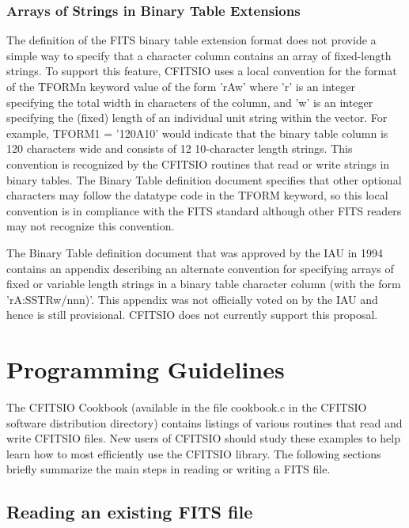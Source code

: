 \subsection{Arrays of Strings in Binary Table Extensions}

The definition of the FITS binary table extension format does not
provide a simple way to specify that a character column contains an
array of fixed-length strings.  To support this feature, CFITSIO uses a
local convention for the format of the TFORMn keyword value of the form
'rAw' where 'r' is an integer specifying the total width in characters
of the column, and 'w' is an integer specifying the (fixed) length of
an individual unit string within the vector.  For example, TFORM1 =
'120A10' would indicate that the binary table column is 120 characters
wide and consists of 12 10-character length strings.  This convention
is recognized by the CFITSIO routines that read or write strings in
binary tables.   The Binary Table definition document specifies that
other optional characters may follow the datatype code in the TFORM
keyword, so this local convention is in compliance with the
FITS standard although other FITS readers may not
recognize this convention.

The Binary Table definition document that was approved by the IAU in
1994 contains an appendix describing an alternate convention for
specifying arrays of fixed or variable length strings in a binary table
character column (with the form 'rA:SSTRw/nnn)'.  This appendix was not
officially voted on by the IAU and hence is still provisional.  CFITSIO
does not currently support this proposal.


\chapter{ Programming Guidelines }

The CFITSIO Cookbook (available in the file cookbook.c in the CFITSIO
software distribution directory) contains listings of various
routines that read and write CFITSIO files.  New users of CFITSIO should
study these examples to help learn how to most efficiently use the
CFITSIO library.   The following sections briefly summarize the
main steps in reading or writing a FITS file.


\section{Reading an existing FITS file}

